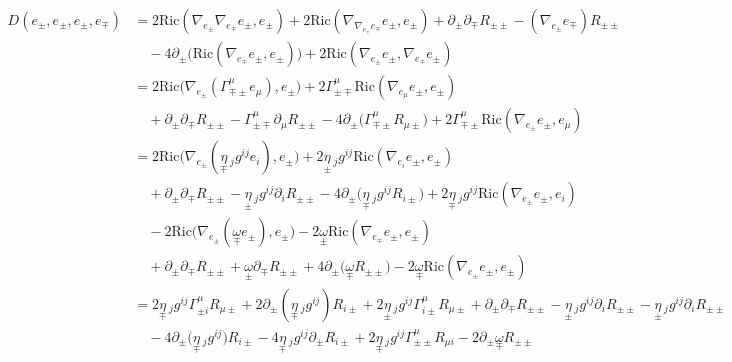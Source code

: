 \documentclass[a4paper,11pt]{article}
\newcommand{\R}{{\mathrm{Ric}}}
\begin{document}
\begin{align*}
    \!\!\!\!\!\!\!\!\!\!\!\!\!\!\!
    D(e_\pm,e_\pm, e_\pm, e_\mp) 
    &=2 \R(\nabla_{e_\pm}\nabla_{{e_\mp}} e_\pm ,e_\pm )
    + 2 \R(\nabla_{\nabla_{e_\pm}{e_\mp}} e_\pm ,e_\pm )
    + \partial_\pm\partial_\mp R_{\pm\pm}
    -(\nabla_{e_\pm} {e_\mp})R_{\pm\pm}\\
    & \quad
    -4 \partial_\pm\big(\R(\nabla_{{e_\mp}} e_\pm , e_\pm )\big)
    + 2 \R(\nabla_{e_\pm} e_\pm , \nabla_{{e_\mp}} e_\pm )\\
    &=2 \R\big(\nabla_{e_\pm}(\Gamma_{\mp\pm}^\mu e_\mu) ,e_\pm \big)
    + 2 \Gamma_{\pm\mp}^\mu\R(\nabla_{e_\mu} e_\pm ,e_\pm )\\
    & \quad + \partial_\pm\partial_\mp R_{\pm\pm}
    -\Gamma_{\pm\mp}^\mu \partial_\mu R_{\pm\pm}
    -4 \partial_\pm\big(\Gamma_{\mp\pm}^\mu R_{\mu\pm}\big)
     + 2 \Gamma_{\mp\pm}^\mu \R(\nabla_{e_\pm} e_\pm , e_\mu ) \\
    &=2 \R\big(\nabla_{e_\pm}(\underset{\mp}{\eta}\,_j g^{ij} e_i) ,e_\pm \big)
    + 2 \underset{\pm}{\eta}\,_j g^{ij} \R(\nabla_{e_i } e_\pm ,e_\pm )\\
    & \quad + \partial_\pm\partial_\mp R_{\pm\pm}
    -\underset{\pm}{\eta}\,_j g^{ij}  \partial_i  R_{\pm\pm}
    -4 \partial_\pm\big(\underset{\mp}{\eta}\,_j g^{ij}  R_{i \pm}\big)
     + 2 \underset{\mp}{\eta}\,_j g^{ij}  \R(\nabla_{e_\pm} e_\pm , e_i  ) \\
    & \quad - 2 \R\big(\nabla_{e_\pm}(\underset{\mp}{\omega} e_\pm) ,e_\pm \big)
    - 2 \underset{\pm}{\omega}\R(\nabla_{e_\mp} e_\pm ,e_\pm )\\
    & \quad + \partial_\pm\partial_\mp R_{\pm\pm}
    +\underset{\pm}{\omega} \partial_\mp R_{\pm\pm}
    +4 \partial_\pm\big(\underset{\mp}{\omega} R_{\pm\pm}\big)
     - 2 \underset{\mp}{\omega} \R(\nabla_{e_\pm} e_\pm , e_\pm ) \\
    &=2 \underset{\mp}{\eta}\,_j g^{ij} \Gamma_{\pm i}^\mu R_{\mu\pm}
    + 2 \partial_\pm(\underset{\mp}{\eta}\,_j g^{ij}) R_{i\pm}
    + 2 \underset{\pm}{\eta}\,_j g^{ij} \Gamma_{i \pm}^\mu R_{\mu\pm}
    + \partial_\pm\partial_\mp R_{\pm\pm} 
    -\underset{\pm}{\eta}\,_j g^{ij}  \partial_i  R_{\pm\pm}
    -\underset{\pm}{\eta}\,_j g^{ij}  \partial_i  R_{\pm\pm}\\
    & \quad
    -4 \partial_\pm\big(\underset{\mp}{\eta}\,_j g^{ij} \big) R_{i \pm}
    -4 \underset{\mp}{\eta}\,_j g^{ij} \partial_\pm R_{i \pm}
     + 2 \underset{\mp}{\eta}\,_j g^{ij} \Gamma_{\pm\pm}^\mu R_{\mu i}
    - 2 \partial_\pm\underset{\mp}{\omega}  R_{\pm\pm}

\end{align*}
\end{document}
